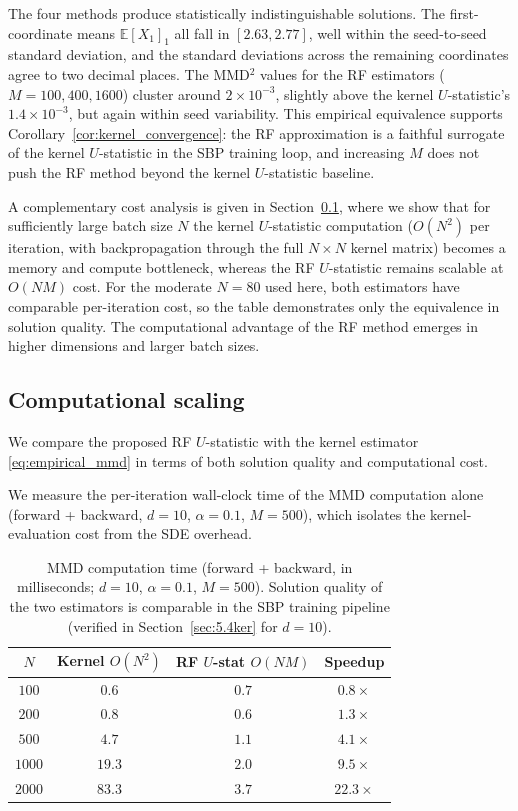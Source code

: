 \documentclass[11pt,leqno]{article}
\theoremstyle{plain}
\theoremstyle{remark}
\theoremstyle{definition}
\numberwithin{equation}{section}
\numberwithin{figure}{section}
\numberwithin{table}{section}
\numberwithin{algorithm}{section}
\newcommand{\EE}{\mathbb{E}}
\begin{document}
The four methods produce statistically indistinguishable solutions. 
The first-coordinate means $\EE[X_1]_1$ all fall in $[2.63, 2.77]$, well within the seed-to-seed standard deviation,
and the standard deviations across the remaining coordinates agree to two decimal places.
The MMD${}^2$ values for the RF estimators ($M=100, 400, 1600$) cluster around $2\times 10^{-3}$,
slightly above the kernel $U$-statistic's $1.4\times 10^{-3}$,
but again within seed variability.
This empirical equivalence supports Corollary~\ref{cor:kernel_convergence}:
the RF approximation is a faithful surrogate of the kernel $U$-statistic in the SBP training loop,
and increasing $M$ does not push the RF method beyond the kernel $U$-statistic baseline.

A complementary cost analysis is given in Section~\ref{sec:5.5comp},
where we show that for sufficiently large batch size $N$ the kernel $U$-statistic computation
($O(N^2)$ per iteration, with backpropagation through the full $N\times N$ kernel matrix)
becomes a memory and compute bottleneck, whereas the RF $U$-statistic remains scalable
at $O(NM)$ cost.
For the moderate $N=80$ used here, both estimators have comparable per-iteration cost,
so the table demonstrates only the equivalence in solution quality. 
The computational advantage of the RF method emerges in higher dimensions and larger batch sizes.


\subsection{Computational scaling}\label{sec:5.5comp}

We compare the proposed RF $U$-statistic with the kernel estimator \eqref{eq:empirical_mmd}
in terms of both solution quality and computational cost.

We measure the per-iteration wall-clock time of the MMD computation alone (forward + backward,
$d=10$, $\alpha=0.1$, $M=500$), which isolates the kernel-evaluation cost from the SDE overhead.

\begin{table}[htbp]
\centering
\caption{MMD computation time (forward + backward, in milliseconds; $d=10$, $\alpha=0.1$, $M=500$).
Solution quality of the two estimators is comparable in the SBP training pipeline
(verified in Section~\ref{sec:5.4ker} for $d=10$).}
\label{tab:scalability_mmd}
\begin{tabular}{cccc}
\toprule
$N$ & Kernel $O(N^2)$ & RF $U$-stat $O(NM)$ & Speedup \\
\midrule
$100$  & $0.6$  & $0.7$ & $0.8\times$ \\
$200$  & $0.8$  & $0.6$ & $1.3\times$ \\
$500$  & $4.7$  & $1.1$ & $4.1\times$ \\
$1000$ & $19.3$ & $2.0$ & $9.5\times$ \\
$2000$ & $83.3$ & $3.7$ & $22.3\times$ \\
\bottomrule
\end{tabular}
\end{table}
\end{document}
